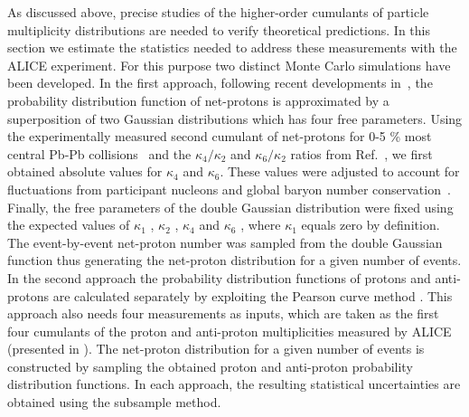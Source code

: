 As discussed above, precise studies of the higher-order cumulants of particle multiplicity distributions are needed to verify theoretical predictions. In this section we estimate the statistics needed to address these measurements with the ALICE experiment. For this purpose two distinct  Monte Carlo simulations have been developed. In the first approach, following recent developments in~\cite{Bzdak:2018axe}, the probability distribution function of net-protons is approximated  by a superposition of two Gaussian distributions which has four free parameters. Using the experimentally measured second cumulant of net-protons for 0-5 \% most central Pb-Pb collisions~\cite{Rustamov:2017lio} and the $\kappa_{4}/\kappa_{2}$ and $\kappa_{6}/\kappa_{2}$ ratios from Ref.~\cite{Almasi:2017bhq}, we first obtained absolute values for $\kappa_{4}$ and $\kappa_{6}$.  These values were adjusted to account for fluctuations from participant nucleons and global baryon number conservation~\cite{Braun-Munzinger:2016yjz, Braun-Munzinger:2018yru}. Finally, the free parameters of the double Gaussian distribution were fixed using the expected values of $\kappa_{1}$ , $\kappa_{2}$ , $\kappa_{4}$ and $\kappa_{6}$ , where $\kappa_{1}$ equals zero by definition. The event-by-event net-proton number was sampled from the double Gaussian function  thus generating the net-proton distribution for a given number of events. 
In the second approach the probability distribution functions of protons and anti-protons are calculated separately by exploiting the Pearson curve method \cite{Behera:2017xwg}. This approach also needs four measurements as inputs, which are taken as the first four cumulants of the proton and anti-proton multiplicities measured by ALICE (presented in \cite{Behera:2018wqk}).  The net-proton distribution for a given number of events is constructed by sampling the obtained proton and anti-proton probability distribution functions. 
In each approach, the resulting statistical uncertainties are obtained using the subsample method.  

